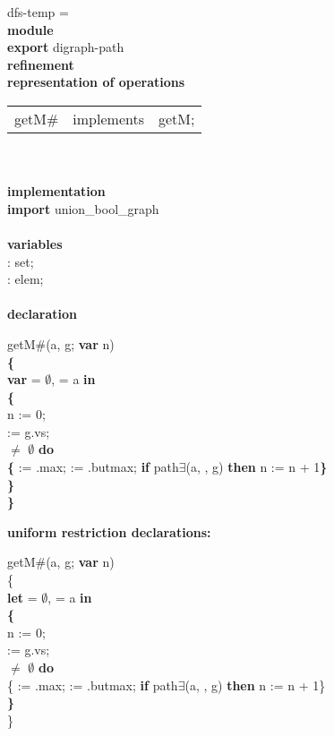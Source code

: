 \begin{tabbing}\label{dfs-temp-module}%
dfs-temp = \\
{\bf mod}\={\bf ule}\+\\
{\bf export} digraph-path\\
{\bf ref}\={\bf inement}\+\\
{\bf rep}\= {\bf resentation of operations}\+\\
\begin{tabular}{lcl}
getM\# & implements & getM;
\end{tabular}\-\\

\\
{\bf implementation}\\
{\bf import} union\_bool\_graph\\
\\
{\bf vari}\={\bf ables}\+\\
: set;\\
: elem;
\-\\
\\

               {\bf declaration}
\end{tabbing}

{\parindent1cm 
getM\#(a, g; {\bf var} n) \\
{\bf \{}\\
{\bf var}  = $\emptyset$,  = a {\bf in}\\
{\bf \{}\\
\tabbe n := 0;\\
\tabbe {} := g.vs;\\
  $\neq$ $\emptyset$ {\bf do}\\
\tabbe {} {\bf \{}  := .max;  := .butmax; {\bf if} path$\exists$(a, , g) {\bf then} n := n + 1{\bf \}}\\
{\bf \}}\\
{\bf \}}
}



\bigskip

{\bf uniform restriction declarations:}

getM\#(a, g; {\bf var} n) \\
\{\\
{\bf let}  = $\emptyset$,  = a {\bf in}\\
{\bf \{}\\
\tabbe n := 0;\\
\tabbe {} := g.vs;\\
  $\neq$ $\emptyset$ {\bf do}\\
\tabbe {} \{ := .max;  := .butmax; {\bf if} path$\exists$(a, , g) {\bf then} n := n + 1\}\\
{\bf \}}\\
\}

\bigskip



\par\mbox{}\hrulefill\mbox{}\par